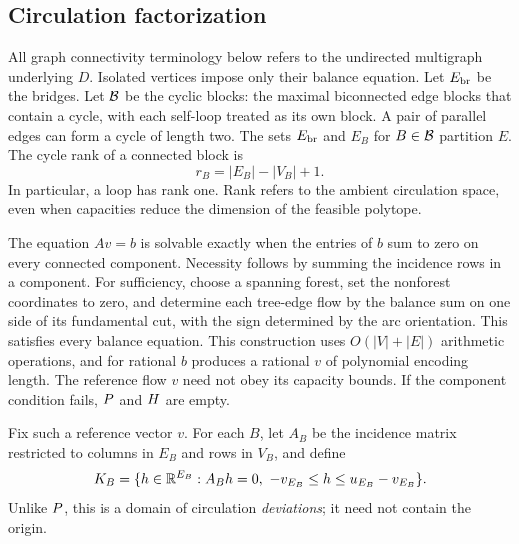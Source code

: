 \subsection{Circulation factorization}\label{subsec:block-factorization}
All graph connectivity terminology below refers to the undirected multigraph
underlying $D$. Isolated vertices impose only their balance equation. Let
$E_{\rm br}$ be the bridges. Let $\mathcal B$ be the cyclic blocks: the maximal
biconnected edge blocks that contain a cycle, with each self-loop treated as
its own block. A pair of parallel edges can form a cycle of length two.
The sets $E_{\rm br}$ and $E_B$ for $B\in\mathcal B$ partition $E$.
The cycle rank of a connected block is
\begin{equation}\label{eq:cycle-rank}
 r_B=|E_B|-|V_B|+1.
\end{equation}
In particular, a loop has rank one. Rank refers to the ambient circulation
space, even when capacities reduce the dimension of the feasible polytope.

The equation $Av=b$ is solvable exactly when the entries of $b$ sum to zero
on every connected component. Necessity follows by summing the incidence
rows in a component. For sufficiency, choose a spanning forest, set the
nonforest coordinates to zero, and determine each tree-edge flow by the
balance sum on one side of its fundamental cut, with the sign determined by
the arc orientation. This satisfies every balance equation. This construction
uses $O(|V|+|E|)$ arithmetic operations, and for rational $b$ produces a
rational $v$ of polynomial encoding length. The reference flow $v$ need not
obey its capacity bounds. If the component condition fails, $P$ and
$H$ are empty.

Fix such a reference vector $v$. For each $B$, let $A_B$ be the incidence
matrix restricted to columns in $E_B$ and rows in $V_B$, and define
\begin{equation}\label{eq:block-domain}
 K_B=\{h\in\mathbb R^{E_B}:A_Bh=0,\ -v_{E_B}\le h\le u_{E_B}-v_{E_B}\}.
\end{equation}
Unlike $P$, this is a domain of circulation \emph{deviations}; it need
not contain the origin.

